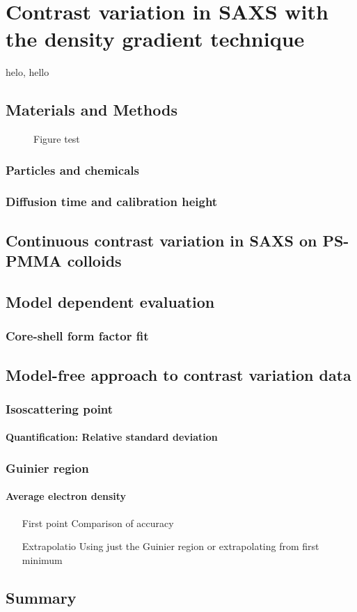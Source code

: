 \chapter{Contrast variation in SAXS with the density gradient technique}
\label{chap:density_gradient_SAXS}
helo, hello
\section{Materials and Methods}
\blindtext[1]
\begin{figure}
	\begin{center}
		
	\end{center}
	\caption{Figure test}
\end{figure}
\subsection{Particles and chemicals}
\subsection{Diffusion time and calibration height}

\section{Continuous contrast variation in SAXS on PS-PMMA colloids}

\section{Model dependent evaluation}
\subsection{Core-shell form factor fit}

\section{Model-free approach to contrast variation data}
\subsection{Isoscattering point}
\subsubsection{Quantification: Relative standard deviation}
\subsection{Guinier region}
\subsubsection{Average electron density}
\begin{itemize}
	\item [First point] Comparison of accuracy
	\item [Extrapolatio] Using just the Guinier region or extrapolating from first minimum
\end{itemize}

\section{Summary}

